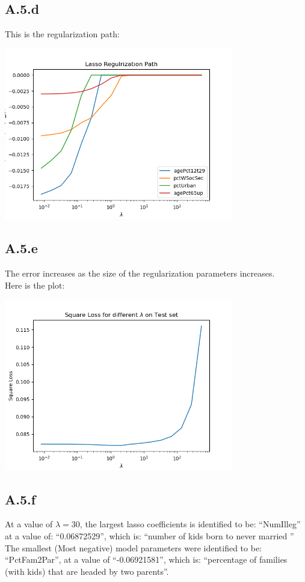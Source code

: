 \documentclass[]{article}
\begin{document}
    \subsection*{A.5.d}
        This is the regularization path: 
        \begin{center}
            \includegraphics[width=10cm]{A5d-plot.png}
        \end{center}
    \subsection*{A.5.e}
        The error increases as the size of the regularization parameters increases. 
        \\
        Here is the plot: 
        \begin{center}
            \includegraphics[width=10cm]{A5e-plot.png }
        \end{center}
    \subsection*{A.5.f}
        At a value of $\lambda = 30$, the largest lasso coefficients is identified to be: ``NumIlleg'' at a value of:  ``0.06872529'', which is: ``number of kids born to never married ''
        \\
        The smallest (Most negative) model parameters were identified to be: ``PctFam2Par'', at a value of  ``-0.06921581'', which is: ``percentage of families (with kids) that are headed by two parents''. 
\end{document}

